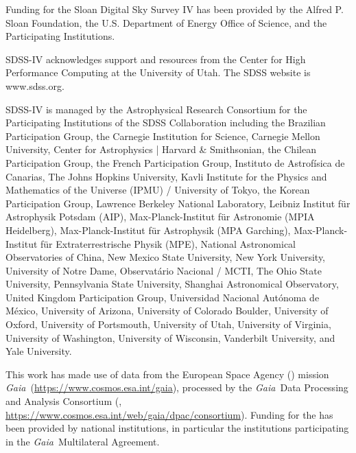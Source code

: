 \documentclass[modern]{aastex63}
\newcommand{\gaia}{\textsl{Gaia}}
\newcommand{\apogee}{\acronym{APOGEE}}
\newcommand{\sdss}{\acronym{SDSS}}
\begin{document}
Funding for the Sloan Digital Sky
Survey IV has been provided by the
Alfred P. Sloan Foundation, the U.S.
Department of Energy Office of
Science, and the Participating
Institutions.

SDSS-IV acknowledges support and
resources from the Center for High
Performance Computing  at the
University of Utah. The SDSS
website is www.sdss.org.

SDSS-IV is managed by the
Astrophysical Research Consortium
for the Participating Institutions
of the SDSS Collaboration including
the Brazilian Participation Group,
the Carnegie Institution for Science,
Carnegie Mellon University, Center for
Astrophysics | Harvard \&
Smithsonian, the Chilean Participation
Group, the French Participation Group,
Instituto de Astrof\'isica de
Canarias, The Johns Hopkins
University, Kavli Institute for the
Physics and Mathematics of the
Universe (IPMU) / University of
Tokyo, the Korean Participation Group,
Lawrence Berkeley National Laboratory,
Leibniz Institut f\"ur Astrophysik
Potsdam (AIP),  Max-Planck-Institut
f\"ur Astronomie (MPIA Heidelberg),
Max-Planck-Institut f\"ur
Astrophysik (MPA Garching),
Max-Planck-Institut f\"ur
Extraterrestrische Physik (MPE),
National Astronomical Observatories of
China, New Mexico State University,
New York University, University of
Notre Dame, Observat\'ario
Nacional / MCTI, The Ohio State
University, Pennsylvania State
University, Shanghai
Astronomical Observatory, United
Kingdom Participation Group,
Universidad Nacional Aut\'onoma
de M\'exico, University of Arizona,
University of Colorado Boulder,
University of Oxford, University of
Portsmouth, University of Utah,
University of Virginia, University
of Washington, University of
Wisconsin, Vanderbilt University,
and Yale University.

This work has made use of data from the European Space Agency ()
mission \gaia\ (\url{https://www.cosmos.esa.int/gaia}), processed by the \gaia\
Data Processing and Analysis Consortium (,
\url{https://www.cosmos.esa.int/web/gaia/dpac/consortium}). Funding for the
\acronym{DPAC}
has been provided by national institutions, in particular the institutions
participating in the \gaia\ Multilateral Agreement.


\end{document}
